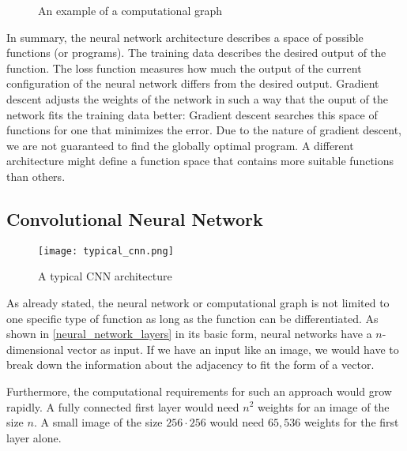 \begin{figure}[!h]
    \centering
    \caption{An example of a computational graph \cite{colah_calculus_nodate}}
    \label{computational_graph}
\end{figure}

In summary, the neural network architecture describes a space of possible functions (or programs). The training data describes the desired output of the function. The loss function measures how much the output of the current configuration of the neural network differs from the desired output. Gradient descent adjusts the weights of the network in such a way that the ouput of the network fits the training data better: Gradient descent searches this space of functions for one that minimizes the error. Due to the nature of gradient descent, we are not guaranteed to find the globally optimal program. A different architecture might define a function space that contains more suitable functions than others.

\subsection{Convolutional Neural Network}
\begin{figure}
    \centering
    \texttt{[image: typical\_cnn.png]}
    \caption{A typical CNN architecture \cite{noauthor_convolutional_2022}}
    \label{typical_cnn}
\end{figure}

As already stated, the neural network or computational graph is not limited to one specific type of function as long as the function can be differentiated. As shown in \ref{neural_network_layers} in its basic form, neural networks have a $n$-dimensional vector as input. If we have an input like an image, we would have to break down the information about the adjacency to fit the form of a vector.

Furthermore, the computational requirements for such an approach would grow rapidly. A fully connected first layer would need $n^2$ weights for an image of the size $n$. A small image of the size $ 256 \cdot 256$ would need $65,536$ weights for the first layer alone.

